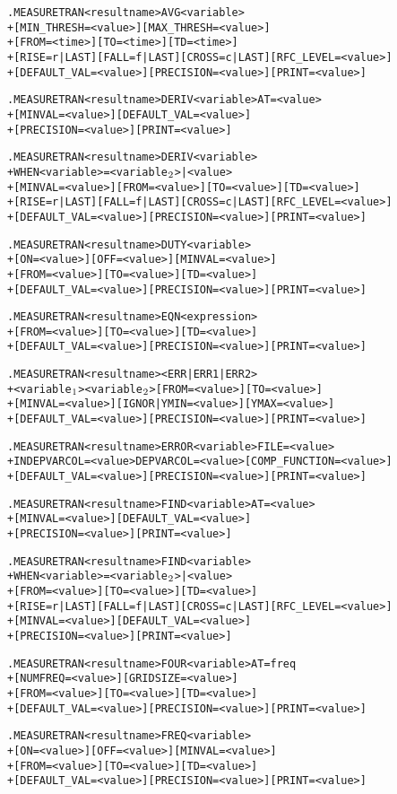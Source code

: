 \begin{Command}
\format
\begin{alltt}
.MEASURE TRAN <result name> AVG <variable>
+ [MIN_THRESH=<value>] [MAX_THRESH=<value>]
+ [FROM=<time>] [TO=<time>] [TD=<time>]
+ [RISE=r|LAST] [FALL=f|LAST] [CROSS=c|LAST] [RFC_LEVEL=<value>]
+ [DEFAULT_VAL=<value>] [PRECISION=<value>] [PRINT=<value>]

.MEASURE TRAN <result name> DERIV <variable> AT=<value>
+ [MINVAL=<value>] [DEFAULT_VAL=<value>] 
+ [PRECISION=<value>] [PRINT=<value>]

.MEASURE TRAN <result name> DERIV <variable>
+ WHEN <variable>=<variable\(\sb{2}\)>|<value>
+ [MINVAL=<value>] [FROM=<value>] [TO=<value>] [TD=<value>] 
+ [RISE=r|LAST] [FALL=f|LAST] [CROSS=c|LAST] [RFC_LEVEL=<value>]
+ [DEFAULT_VAL=<value>] [PRECISION=<value>] [PRINT=<value>]

.MEASURE TRAN <result name> DUTY <variable>
+ [ON=<value>] [OFF=<value>] [MINVAL=<value>]
+ [FROM=<value>] [TO=<value>] [TD=<value>]
+ [DEFAULT_VAL=<value>] [PRECISION=<value>] [PRINT=<value>]

.MEASURE TRAN <result name> EQN <expression> 
+ [FROM=<value>] [TO=<value>] [TD=<value>]
+ [DEFAULT_VAL=<value>] [PRECISION=<value>] [PRINT=<value>]

.MEASURE TRAN <result name> <ERR|ERR1|ERR2>
+ <variable\(\sb{1}\)> <variable\(\sb{2}\)> [FROM=<value>] [TO=<value>]
+ [MINVAL=<value>] [IGNOR|YMIN=<value>] [YMAX=<value>]
+ [DEFAULT_VAL=<value>] [PRECISION=<value>] [PRINT=<value>]

.MEASURE TRAN <result name> ERROR <variable> FILE=<value>
+ INDEPVARCOL=<value> DEPVARCOL=<value> [COMP_FUNCTION=<value>]
+ [DEFAULT_VAL=<value>] [PRECISION=<value>] [PRINT=<value>]

.MEASURE TRAN <result name> FIND <variable> AT=<value>
+ [MINVAL=<value>] [DEFAULT_VAL=<value>]
+ [PRECISION=<value>] [PRINT=<value>]

.MEASURE TRAN <result name> FIND <variable>
+ WHEN <variable>=<variable\(\sb{2}\)>|<value>
+ [FROM=<value>] [TO=<value>] [TD=<value>] 
+ [RISE=r|LAST] [FALL=f|LAST] [CROSS=c|LAST] [RFC_LEVEL=<value>]
+ [MINVAL=<value>] [DEFAULT_VAL=<value>] 
+ [PRECISION=<value>] [PRINT=<value>]

.MEASURE TRAN <result name> FOUR <variable> AT=freq
+ [NUMFREQ=<value>] [GRIDSIZE=<value>]
+ [FROM=<value>] [TO=<value>] [TD=<value>] 
+ [DEFAULT_VAL=<value>] [PRECISION=<value>] [PRINT=<value>]

.MEASURE TRAN <result name> FREQ <variable>
+ [ON=<value>] [OFF=<value>] [MINVAL=<value>]
+ [FROM=<value>] [TO=<value>] [TD=<value>] 
+ [DEFAULT_VAL=<value>] [PRECISION=<value>] [PRINT=<value>]


\end{alltt}
\end{Command}
